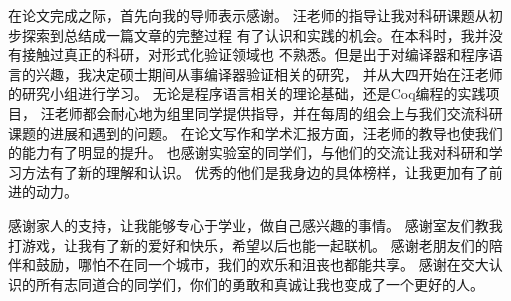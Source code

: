 
\begin{acknowledgements}
  在论文完成之际，首先向我的导师表示感谢。
  汪老师的指导让我对科研课题从初步探索到总结成一篇文章的完整过程
  有了认识和实践的机会。在本科时，我并没有接触过真正的科研，对形式化验证领域也
  不熟悉。但是出于对编译器和程序语言的兴趣，我决定硕士期间从事编译器验证相关的研究，
  并从大四开始在汪老师的研究小组进行学习。
  无论是程序语言相关的理论基础，还是Coq编程的实践项目，
  汪老师都会耐心地为组里同学提供指导，并在每周的组会上与我们交流科研课题的进展和遇到的问题。
  在论文写作和学术汇报方面，汪老师的教导也使我们的能力有了明显的提升。
  也感谢实验室的同学们，与他们的交流让我对科研和学习方法有了新的理解和认识。
  优秀的他们是我身边的具体榜样，让我更加有了前进的动力。
  
  感谢家人的支持，让我能够专心于学业，做自己感兴趣的事情。
  感谢室友们教我打游戏，让我有了新的爱好和快乐，希望以后也能一起联机。
  感谢老朋友们的陪伴和鼓励，哪怕不在同一个城市，我们的欢乐和沮丧也都能共享。
  感谢在交大认识的所有志同道合的同学们，你们的勇敢和真诚让我也变成了一个更好的人。
\end{acknowledgements}
